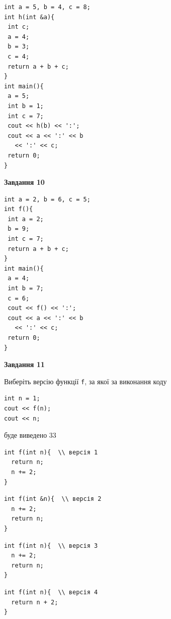 \documentclass[12pt, ukrainian]{article}
\def\code#1{\Verb!#1!}
\begin{document}
{\begin {large}
\begin{minipage}[t]{7.0cm}
\begin{verbatim}
int a = 5, b = 4, c = 8;
int h(int &a){
 int c;
 a = 4;
 b = 3;
 c = 4;
 return a + b + c;
}
int main(){
 a = 5;
 int b = 1;
 int c = 7;
 cout << h(b) << ':';
 cout << a << ':' << b 
   << ':' << c;
 return 0;
}
\end{verbatim}



\begin{center}
\textbf{Завдання 10}
\end{center}
\vspace{-8mm}

\begin{verbatim}
int a = 2, b = 6, c = 5;
int f(){
 int a = 2;
 b = 9;
 int c = 7;
 return a + b + c;
}
int main(){
 a = 4;
 int b = 7;
 c = 6;
 cout << f() << ':';
 cout << a << ':' << b 
   << ':' << c;
 return 0;
}
\end{verbatim}

\end{minipage}
\vline \hspace{1mm}
\begin{minipage}[t]{11.0cm}

\begin{center}
\textbf{Завдання 11}
\end{center}
Виберіть версію функції \code{f}, за якої за виконання коду
\begin{verbatim}
int n = 1;
cout << f(n);
cout << n;
\end{verbatim}

буде виведено 33

\begin{verbatim}
int f(int n){  \\ версія 1
  return n;
  n += 2;
}
\end{verbatim}

\vspace{-8mm}\begin{verbatim}
int f(int &n){  \\ версія 2
  n += 2;
  return n;
}
\end{verbatim}

\vspace{-8mm}\begin{verbatim}
int f(int n){  \\ версія 3
  n += 2;
  return n;
}
\end{verbatim}

\vspace{-8mm}\begin{verbatim}
int f(int n){  \\ версія 4
  return n + 2;
}
\end{verbatim}




\end{minipage}
\end{large}}
\end{document}
